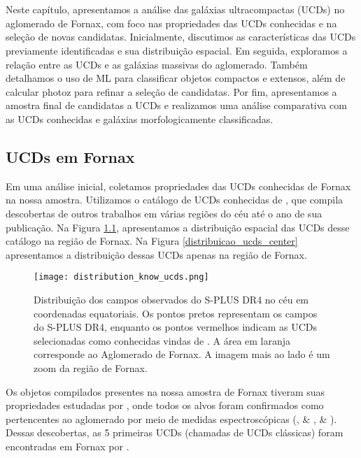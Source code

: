 \chapter{\chapternameanalysis}\label{analise}
Neste capítulo, apresentamos a análise das galáxias ultracompactas (UCDs) no aglomerado de Fornax, com foco nas propriedades das UCDs conhecidas e na seleção de novas candidatas. Inicialmente, discutimos as características das UCDs previamente identificadas e sua distribuição espacial. Em seguida, exploramos a relação entre as UCDs e as galáxias massivas do aglomerado. Também detalhamos o uso de \ac{ML} para classificar objetos compactos e extensos, além de calcular \ac{photoz} para refinar a seleção de candidatas. Por fim, apresentamos a amostra final de candidatas a UCDs e realizamos uma análise comparativa com as UCDs conhecidas e galáxias morfologicamente classificadas.

\section{UCDs em Fornax}\label{sec:ucds_fornax}
Em uma análise inicial, coletamos propriedades das UCDs conhecidas de Fornax na nossa amostra. Utilizamos o catálogo de UCDs conhecidas de \cite{catalog_ucds}, que compila descobertas de outros trabalhos em várias regiões do céu até o ano de sua publicação. Na Figura \ref{distribution_know_ucds}, apresentamos a distribuição espacial das UCDs desse catálogo na região de Fornax. Na Figura \ref{distribuicao_ucds_center} apresentamos a distribuição dessas UCDs apenas na região de Fornax.

\begin{figure}[!ht]
    \centering
    \texttt{[image: distribution\_know\_ucds.png]}
    \caption[]{Distribuição dos campos observados do S-PLUS DR4 no céu em coordenadas equatoriais. Os pontos pretos representam os campos do S-PLUS DR4, enquanto os pontos vermelhos indicam as UCDs selecionadas como conhecidas vindas de \cite{catalog_ucds}. A área em laranja corresponde ao Aglomerado de Fornax. A imagem mais ao lado é um zoom da região de Fornax.}
    \label{distribution_know_ucds}
\end{figure}

Os objetos compilados presentes na nossa amostra de Fornax tiveram suas propriedades estudadas por \cite{Mieske_2008_2}, onde todos os alvos foram confirmados como pertencentes ao aglomerado por meio de medidas espectroscópicas (\citealt{Drinkwater_2000}, \citealt{Mieske_2002} \& \citeyear{Mieske_2004}, \citealt{Richtler_2004} \& \citeyear{Richtler_2008}). Dessas descobertas, as 5 primeiras UCDs (chamadas de UCDs clássicas) foram encontradas em Fornax por \cite{Drinkwater_2000}.

